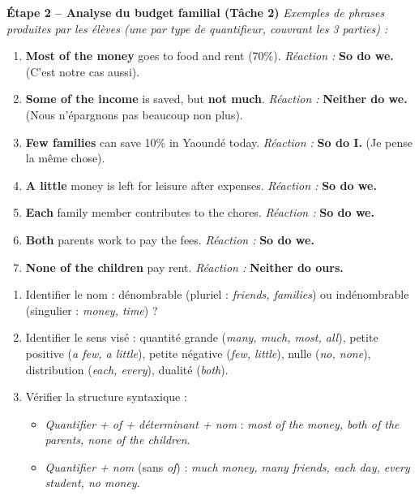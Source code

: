 \documentclass[11pt]{article}
\begin{document}
\textbf{Étape 2 -- Analyse du budget familial (Tâche 2)}
\textit{Exemples de phrases produites par les élèves (une par type de quantifieur, couvrant les 3 parties) :}
\begin{enumerate}
    \item \textbf{Most of the money} goes to food and rent (70\%). \rightarrow \textit{Réaction :} \textbf{So do we.} (C'est notre cas aussi).
    \item \textbf{Some of the income} is saved, but \textbf{not much}. \rightarrow \textit{Réaction :} \textbf{Neither do we.} (Nous n'épargnons pas beaucoup non plus).
    \item \textbf{Few families} can save 10\% in Yaoundé today. \rightarrow \textit{Réaction :} \textbf{So do I.} (Je pense la même chose).
    \item \textbf{A little} money is left for leisure after expenses. \rightarrow \textit{Réaction :} \textbf{So do we.}
    \item \textbf{Each} family member contributes to the chores. \rightarrow \textit{Réaction :} \textbf{So do we.}
    \item \textbf{Both} parents work to pay the fees. \rightarrow \textit{Réaction :} \textbf{So do we.}
    \item \textbf{None of the children} pay rent. \rightarrow \textit{Réaction :} \textbf{Neither do ours.}
\end{enumerate}
\begin{methode}
\begin{enumerate}
    \item Identifier le nom : dénombrable (pluriel : \emph{friends, families}) ou indénombrable (singulier : \emph{money, time}) ?
    \item Identifier le sens visé : quantité grande (\emph{many, much, most, all}), petite positive (\emph{a few, a little}), petite négative (\emph{few, little}), nulle (\emph{no, none}), distribution (\emph{each, every}), dualité (\emph{both}).
    \item Vérifier la structure syntaxique :
    \begin{itemize}
        \item \emph{Quantifier + of + déterminant + nom} : \emph{most of the money, both of the parents, none of the children}.
        \item \emph{Quantifier + nom} (sans \emph{of}) : \emph{much money, many friends, each day, every student, no money}.
    \end{itemize}
\end{enumerate}
\end{methode}
\end{document}
